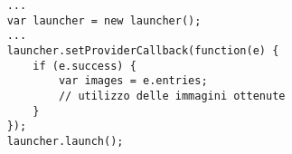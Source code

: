 \begin{lstlisting}
	...
	var launcher = new launcher();
	...
	launcher.setProviderCallback(function(e) {
		if (e.success) {
			var images = e.entries;
			// utilizzo delle immagini ottenute
		}
	});
	launcher.launch();
\end{lstlisting}
